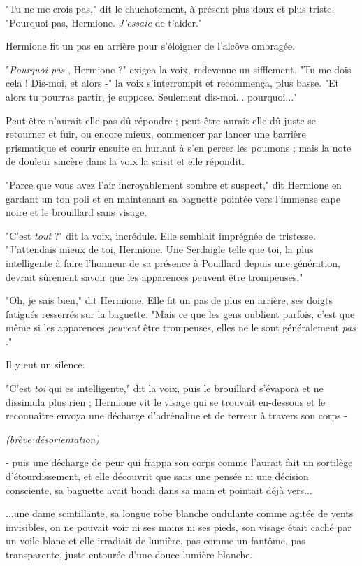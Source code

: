 "Tu ne me crois pas," dit le chuchotement, à présent plus doux et plus triste. "Pourquoi pas, Hermione. \emph{J'essaie}  de t'aider."

Hermione fit un pas en arrière pour s'éloigner de l'alcôve ombragée.

"\emph{Pourquoi pas} , Hermione ?" exigea la voix, redevenue un sifflement. "Tu me dois cela ! Dis-moi, et alors -" la voix s'interrompit et recommença, plus basse. "Et alors tu pourras partir, je suppose. Seulement dis-moi... pourquoi..."

Peut-être n'aurait-elle pas dû répondre ; peut-être aurait-elle dû juste se retourner et fuir, ou encore mieux, commencer par lancer une barrière prismatique et courir ensuite en hurlant à s'en percer les poumons ; mais la note de douleur sincère dans la voix la saisit et elle répondit.

"Parce que vous avez l'air incroyablement sombre et suspect," dit Hermione en gardant un ton poli et en maintenant sa baguette pointée vers l'immense cape noire et le brouillard sans visage.

"C'est \emph{tout}  ?" dit la voix, incrédule. Elle semblait imprégnée de tristesse. "J'attendais mieux de toi, Hermione. Une Serdaigle telle que toi, la plus intelligente à faire l'honneur de sa présence à Poudlard depuis une génération, devrait sûrement savoir que les apparences peuvent être trompeuses."

"Oh, je sais bien," dit Hermione. Elle fit un pas de plus en arrière, ses doigts fatigués resserrés sur la baguette. "Mais ce que les gens oublient parfois, c'est que même si les apparences \emph{peuvent}  être trompeuses, elles ne le sont généralement \emph{pas} ."

Il y eut un silence.

"C'est \emph{toi}  qui es intelligente," dit la voix, puis le brouillard s'évapora et ne dissimula plus rien ; Hermione vit le visage qui se trouvait en-dessous et le reconnaître envoya une décharge d'adrénaline et de terreur à travers son corps -

\emph{(brève désorientation)} 

- puis une décharge de peur qui frappa son corps comme l'aurait fait un sortilège d'étourdissement, et elle découvrit que sans une pensée ni une décision consciente, sa baguette avait bondi dans sa main et pointait déjà vers...

...une dame scintillante, sa longue robe blanche ondulante comme agitée de vents invisibles, on ne pouvait voir ni ses mains ni ses pieds, son visage était caché par un voile blanc et elle irradiait de lumière, pas comme un fantôme, pas transparente, juste entourée d'une douce lumière blanche.

